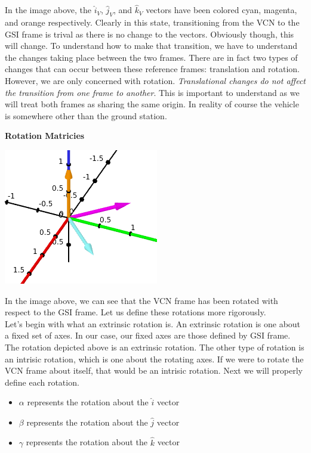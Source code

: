 \documentclass[12pt, letterpaper]{article}
\begin{document}
In the image above, the $\hat{i}_V$, $\hat{j}_V$, and $\hat{k}_V$ vectors have been colored cyan, magenta, and orange respectively. Clearly in this state, transitioning from the VCN to the GSI frame is trival as there is no change to the vectors. Obviously though, this will change. To understand how to make that transition, we have to understand the changes taking place between the two frames. There are in fact two types of changes that can occur between these reference frames: translation and rotation. However, we are only concerned with rotation. \textit{Translational changes do not affect the transition from one frame to another}. This is important to understand as we will treat both frames as sharing the same origin. In reality of course the vehicle is somewhere other than the ground station.
\pagebreak

\begin{center}
\textbf{Rotation Matricies}
\end{center}
\begin{center}
\includegraphics[scale=0.75]{VCN_rot}
\end{center}
In the image above, we can see that the VCN frame has been rotated with respect to the GSI frame. Let us define these rotations more rigorously. \\
Let's begin with what an extrinsic rotation is. An extrinsic rotation is one about a fixed set of axes. In our case, our fixed axes are those defined by GSI frame. The rotation depicted above is an extrinsic rotation. The other type of rotation is an intrisic rotation, which is one about the rotating axes. If we were to rotate the VCN frame about itself, that would be an intrisic rotation. Next we will properly define each rotation.
\begin{itemize}
\item $\alpha$ represents the rotation about the $\hat{i}$ vector
\item $\beta$ represents the rotation about the $\hat{j}$ vector
\item $\gamma$ represents the rotation about the $\hat{k}$ vector
\end{itemize}
\end{document}
